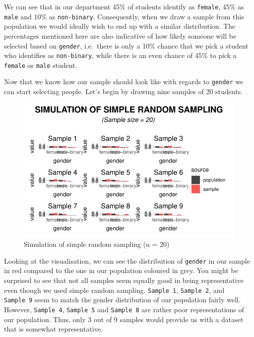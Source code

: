\documentclass[
  letterpaper,
]{krantz}
\begin{document}
We can see that in our department 45\% of students identify as
\texttt{female}, 45\% as \texttt{male} and 10\% as \texttt{non-binary}.
Consequently, when we draw a sample from this population we would
ideally wish to end up with a similar distribution. The percentages
mentioned here are also indicative of how likely someone will be
selected based on \texttt{gender}, i.e.~there is only a 10\% chance that
we pick a student who identifies as \texttt{non-binary}, while there is
an even chance of 45\% to pick a \texttt{female} or \texttt{male}
student.

Now that we know how our sample should look like with regards to
\texttt{gender} we can start selecting people. Let's begin by drawing
nine samples of 20 students.

\begin{figure}[H]

{\centering \includegraphics{09_sources_of_bias_files/figure-latex/drawing-samples-of-20-1.pdf}

}

\caption{Simulation of simple random sampling (n = 20)}

\end{figure}%

Looking at the visualisation, we can see the distribution of
\texttt{gender} in our sample in red compared to the one in our
population coloured in grey. You might be surprised to see that not all
samples seem equally good in being representative even though we used
simple random sampling. \texttt{Sample\ 1}, \texttt{Sample\ 2}, and
\texttt{Sample\ 9} seem to match the gender distribution of our
population fairly well. However, \texttt{Sample\ 4}, \texttt{Sample\ 5}
and \texttt{Sample\ 8} are rather poor representations of our
population. Thus, only 3 out of 9 samples would provide us with a
dataset that is somewhat representative.
\end{document}
